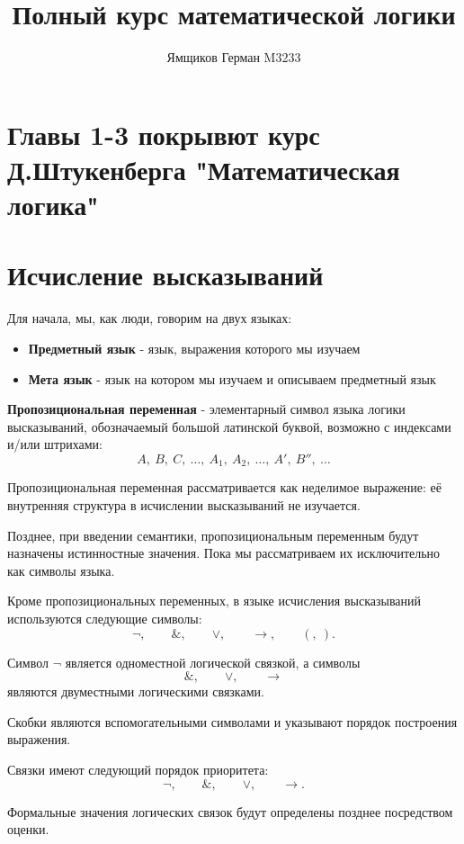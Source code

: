 \documentclass[12pt,a4paper,oneside,openany]{book}
\title{\sffamily\bfseries\color{logicblue}Полный курс математической логики}
\author{Ямщиков Герман M3233}
\theoremstyle{definition}
\theoremstyle{plain}
\theoremstyle{remark}
\begin{document}
\maketitle
\tableofcontents
\chapter*{Главы 1-3 покрывют курс Д.Штукенберга "Математическая логика"}

\chapter{Исчисление высказываний}
Для начала, мы, как люди, говорим на двух языках:
\begin{itemize}
    \item \textbf{Предметный язык} - язык, выражения которого мы изучаем
    \item \textbf{Мета язык} - язык на котором мы изучаем и описываем предметный язык 
\end{itemize}

\textbf{Пропозициональная переменная} - элементарный символ языка логики высказываний, обозначаемый большой латинской буквой, возможно с индексами и/или штрихами:
\[
A,\ B,\ C,\ \ldots,\ A_1,\ A_2,\ \ldots,\ A',\ B'',\ \ldots
\]

Пропозициональная переменная рассматривается как неделимое выражение:
её внутренняя структура в исчислении высказываний не изучается.

Позднее, при введении семантики, пропозициональным переменным будут
назначены истинностные значения. Пока мы рассматриваем их исключительно
как символы языка.

Кроме пропозициональных переменных, в языке исчисления высказываний
используются следующие символы:
\[
\neg,\qquad
\mathbin{\&},\qquad
\lor,\qquad
\to,\qquad
(,\ ).
\]

Символ \(\neg\) является одноместной логической связкой, а символы
\[
\mathbin{\&},\qquad \lor,\qquad \to
\]
являются двуместными логическими связками.

Скобки являются вспомогательными символами и указывают порядок построения
выражения.

Связки имеют следующий порядок приоритета:
\[
\neg,\qquad
\mathbin{\&},\qquad
\lor,\qquad
\to.
\]

Формальные значения логических связок будут определены позднее
посредством оценки.
\vspace{6mm}
\end{document}
